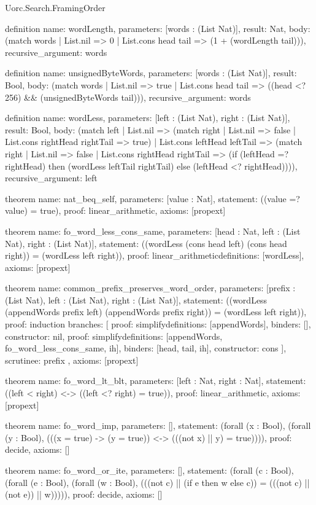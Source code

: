 \begin{lexlean}{Uorc.Search.FramingOrder}
\begin{semanticmodule}
definition{
  name: wordLength,
  parameters: [words : (List Nat)],
  result: Nat,
  body: (match words | List.nil => 0 | List.cons head tail => (1 + (wordLength tail))),
  recursive_argument: words
}

definition{
  name: unsignedByteWords,
  parameters: [words : (List Nat)],
  result: Bool,
  body: (match words
    | List.nil => true
    | List.cons head tail => ((head <? 256) && (unsignedByteWords tail))),
  recursive_argument: words
}

definition{
  name: wordLess,
  parameters: [left : (List Nat), right : (List Nat)],
  result: Bool,
  body: (match left
    | List.nil => (match right | List.nil => false | List.cons rightHead rightTail => true)
    | List.cons leftHead leftTail => (match right
      | List.nil => false
      | List.cons rightHead rightTail => (if (leftHead =? rightHead) then (wordLess leftTail rightTail) else (leftHead <? rightHead)))),
  recursive_argument: left
}

theorem{
  name: nat_beq_self,
  parameters: [value : Nat],
  statement: ((value =? value) = true),
  proof: linear_arithmetic{},
  axioms: [propext]
}

theorem{
  name: fo_word_less_cons_same,
  parameters: [head : Nat, left : (List Nat), right : (List Nat)],
  statement: ((wordLess (cons head left) (cons head right)) = (wordLess left right)),
  proof: linear_arithmetic{definitions: [wordLess]},
  axioms: [propext]
}

theorem{
  name: common_prefix_preserves_word_order,
  parameters: [prefix : (List Nat), left : (List Nat), right : (List Nat)],
  statement: ((wordLess (appendWords prefix left) (appendWords prefix right)) = (wordLess left right)),
  proof: induction{
    branches: [
      {proof: simplify{definitions: [appendWords]}, binders: [], constructor: nil},
      {
        proof: simplify{definitions: [appendWords, fo_word_less_cons_same, ih]},
        binders: [head, tail, ih],
        constructor: cons
      }
    ],
    scrutinee: prefix
  },
  axioms: [propext]
}

theorem{
  name: fo_word_lt_blt,
  parameters: [left : Nat, right : Nat],
  statement: ((left < right) <-> ((left <? right) = true)),
  proof: linear_arithmetic{},
  axioms: [propext]
}

theorem{
  name: fo_word_imp,
  parameters: [],
  statement: (forall (x : Bool), (forall (y : Bool), (((x = true) -> (y = true)) <-> (((not x) || y) = true)))),
  proof: decide{},
  axioms: []
}

theorem{
  name: fo_word_or_ite,
  parameters: [],
  statement: (forall (c : Bool), (forall (e : Bool), (forall (w : Bool), (((not c) || (if e then w else c)) = (((not c) || (not e)) || w))))),
  proof: decide{},
  axioms: []
}


\end{semanticmodule}
\end{lexlean}

